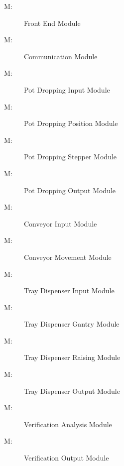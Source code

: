 \documentclass[12pt, titlepage]{article}
\newcounter{mnum}
\newcommand{\mthemnum}{M\themnum}
\begin{document}
\begin{description}
\item [ \mthemnum \label{mFE}:] Front End Module
\item [ \mthemnum \label{mCO}:] Communication Module
\item [ \mthemnum \label{mPDI}:] Pot Dropping Input Module
\item [ \mthemnum \label{mPDP}:] Pot Dropping Position Module
\item [ \mthemnum \label{mPDS}:] Pot Dropping Stepper Module
\item [ \mthemnum \label{mPDO}:] Pot Dropping Output Module
\item [ \mthemnum \label{mCI}:] Conveyor Input Module
\item [ \mthemnum \label{mCM}:] Conveyor Movement Module
\item [ \mthemnum \label{mTDI}:] Tray Dispenser Input Module
\item [ \mthemnum \label{mTDG}:] Tray Dispenser Gantry Module
\item [ \mthemnum \label{mTDR}:] Tray Dispenser Raising Module
\item [ \mthemnum \label{mTDO}:] Tray Dispenser Output Module
\item [ \mthemnum \label{mVA}:] Verification Analysis Module
\item [ \mthemnum \label{mVO}:] Verification Output Module


\end{description}
\end{document}
